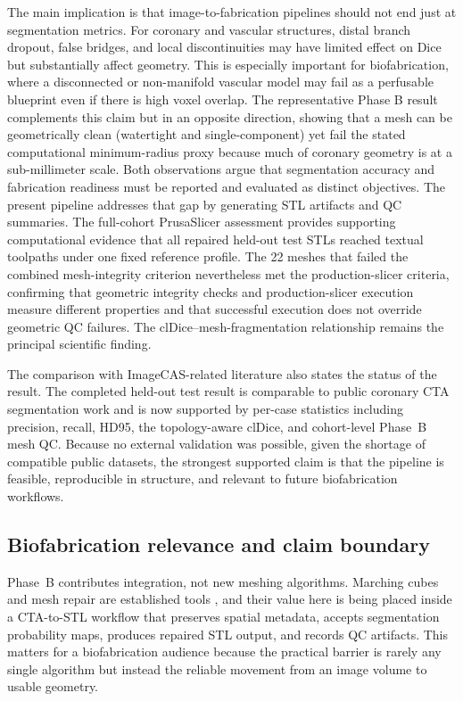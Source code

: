 \documentclass[anonymous]{iopjournal}
\begin{document}
\FloatBarrier

The main implication is that image-to-fabrication pipelines should not end just at segmentation metrics. For coronary and vascular structures, distal branch dropout, false bridges, and local discontinuities may have limited effect on Dice but substantially affect geometry. This is especially important for biofabrication, where a disconnected or non-manifold vascular model may fail as a perfusable blueprint even if there is high voxel overlap. The representative Phase B result complements this claim but in an opposite direction, showing that a mesh can be geometrically clean (watertight and single-component) yet fail the stated computational minimum-radius proxy because much of coronary geometry is at a sub-millimeter scale. Both observations argue that segmentation accuracy and fabrication readiness must be reported and evaluated as distinct objectives. The present pipeline addresses that gap by generating STL artifacts and QC summaries. The full-cohort PrusaSlicer assessment provides supporting computational evidence that all repaired held-out test STLs reached textual toolpaths under one fixed reference profile. The 22 meshes that failed the combined mesh-integrity criterion nevertheless met the production-slicer criteria, confirming that geometric integrity checks and production-slicer execution measure different properties and that successful execution does not override geometric QC failures. The clDice--mesh-fragmentation relationship remains the principal scientific finding.

The comparison with ImageCAS-related literature also states the status of the result. The completed held-out test result is comparable to public coronary CTA segmentation work and is now supported by per-case statistics including precision, recall, HD95, the topology-aware clDice, and cohort-level Phase~B mesh QC. Because no external validation was possible, given the shortage of compatible public datasets, the strongest supported claim is that the pipeline is feasible, reproducible in structure, and relevant to future biofabrication workflows.


\subsection{Biofabrication relevance and claim boundary}

Phase~B contributes integration, not new meshing algorithms. Marching cubes and mesh repair are established tools \cite{lorensen1987,lewiner2003}, and their value here is being placed inside a CTA-to-STL workflow that preserves spatial metadata, accepts segmentation probability maps, produces repaired STL output, and records QC artifacts. This matters for a biofabrication audience because the practical barrier is rarely any single algorithm but instead the reliable movement from an image volume to usable geometry.
\end{document}
